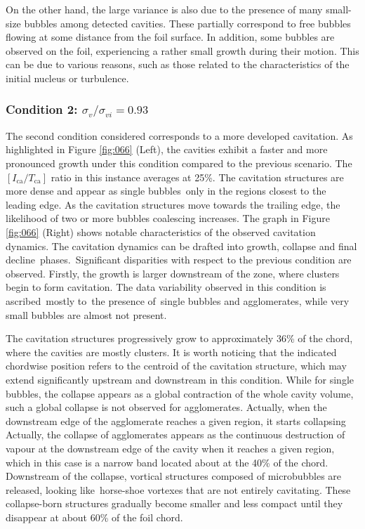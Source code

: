 On the other hand, the large variance is also due to the presence of many small-size bubbles among detected cavities. These partially correspond to free bubbles flowing at some distance from the foil surface. In addition, some bubbles are observed on the foil, experiencing a rather small growth during their motion. This can be due to various reasons, such as those related to the characteristics of the initial nucleus or turbulence.

\subsubsection{Condition 2: $\sigma_v/\sigma_{vi} = 0.93$}
\label{sez:stereo_2}
The second condition considered corresponds to a more developed cavitation. As highlighted in Figure \ref{fig:066} (Left), the cavities exhibit a faster and more pronounced growth under this condition compared to the previous scenario. The $[I_{\text{ca}} / T_{\text{ca}}]$ ratio in this instance averages at 25\%. The cavitation structures are more dense and appear as single bubbles only in the regions closest to the leading edge.
As the cavitation structures move towards the trailing edge, the likelihood of two or more bubbles coalescing increases.
The graph in Figure \ref{fig:066} (Right) shows notable characteristics of the observed cavitation dynamics. 
The cavitation dynamics can be drafted into growth, collapse and final decline phases. Significant disparities with respect to the previous condition are observed.
Firstly, the growth is larger downstream of the zone, where clusters begin to form cavitation.
The data variability observed in this condition is ascribed mostly to the presence of single bubbles and agglomerates, while very small bubbles are almost not present.

The cavitation structures progressively grow to approximately 36\% of the chord, where the cavities are mostly clusters. 
It is worth noticing that the indicated chordwise position refers to the centroid of the cavitation structure, which may extend significantly upstream and downstream in this condition. While for single bubbles, the collapse appears as a global contraction of the whole cavity volume, such a global collapse is not observed for agglomerates.
Actually, when the downstream edge of the agglomerate reaches a given region, it starts collapsing
Actually, the collapse of agglomerates appears as the continuous destruction of vapour at the downstream edge of the cavity when it reaches a given region, which in this case is a narrow band located about at the 40\% of the chord.
Downstream of the collapse, vortical structures composed of microbubbles are released, looking like horse-shoe vortexes that are not entirely cavitating. These collapse-born structures gradually become smaller and less compact until they disappear at about 60\% of the foil chord.

